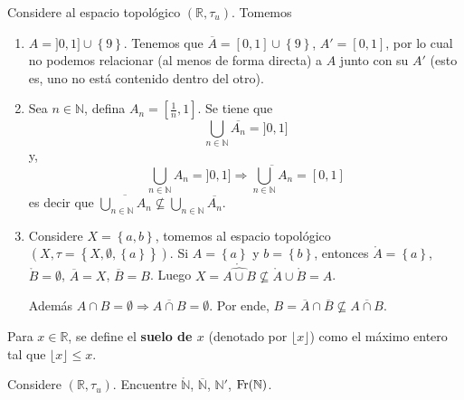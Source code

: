 \documentclass[12pt]{report}
\theoremstyle{largebreak}
\newcommand{\Int}[1]{\ensuremath{\mathring{#1}}}
\newcommand{\Cls}[1]{\ensuremath{\overline{#1}}}
\newcommand{\Fr}[1]{\ensuremath{\textup{Fr}(#1)}}
\newcommand{\floor}[1]{\ensuremath{\lfloor#1\rfloor}}
\begin{document}
    \begin{exa}
        Considere al espacio topológico $(\mathbb{R},\tau_u)$. Tomemos
        \begin{enumerate}
            \item $A=]0,1]\cup\left\{9\right\}$. Tenemos que $\Cls{A}=[0,1]\cup\left\{9\right\}$, $A'=[0,1]$, por lo cual no podemos relacionar (al menos de forma directa) a $A$ junto con su $A'$ (esto es, uno no está contenido dentro del otro).
            \item Sea $n\in\mathbb{N}$, defina $A_n=[\frac{1}{n},1]$. Se tiene que
            \begin{equation*}
                \bigcup_{n\in\mathbb{N}}\Cls{A_n}=]0,1]
            \end{equation*}
            y,
            \begin{equation*}
                \bigcup_{n\in\mathbb{N}}A_n=]0,1]\Rightarrow \Cls{\bigcup_{n\in\mathbb{N}}A_n}=[0,1]
            \end{equation*}
            es decir que $\Cls{\bigcup_{n\in\mathbb{N}}A_n}\nsubseteq\bigcup_{n\in\mathbb{N}}\Cls{A_n}$.
            \item Considere $X=\left\{a,b\right\}$, tomemos al espacio topológico $(X,\tau=\left\{X,\emptyset,\left\{a\right\} \right\})$. Si $A=\left\{a\right\}$ y $b=\left\{b\right\}$, entonces $\Int{A}=\left\{a\right\}$, $\Int{B}=\emptyset$, $\Cls{A}=X$, $\Cls{B}=B$. Luego $X=\Int{\widehat{A\cup B}}\nsubseteq \Int{A}\cup\Int{B}=A$.
            
            Además $A\cap B=\emptyset\Rightarrow\Cls{A\cap B}=\emptyset$. Por ende, $B=\Cls{A}\cap \Cls{B}\nsubseteq\Cls{A\cap B}$.
        \end{enumerate}
    \end{exa}

    \begin{mydef}
        Para $x\in\mathbb{R}$, se define el \textbf{suelo de $x$} (denotado por $\floor{x}$) como el máximo entero tal que $\floor{x}\leq x$.
    \end{mydef}

    \begin{excer}
        Considere $(\mathbb{R},\tau_u)$. Encuentre $\Int{\mathbb{N}}$, $\Cls{\mathbb{N}}$, $\mathbb{N}'$, $\Fr{\mathbb{N}}$.
    \end{excer}
\end{document}
